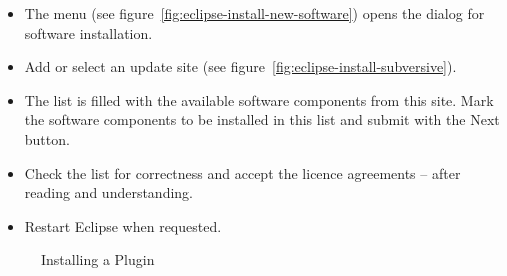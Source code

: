 \begin{itemize}
\item The menu  (see
  figure~\ref{fig:eclipse-install-new-software}) opens the dialog for
  software installation.
\item Add or select an update site (see
  figure~\ref{fig:eclipse-install-subversive}).
\item The list is filled with the available software components from
  this site.  Mark the software components to be installed in this
  list and submit with the \textsf{Next} button.
\item Check the list for correctness and accept the licence agreements
  -- after reading and understanding.
\item Restart Eclipse when requested.
\end{itemize}
\begin{figure}[ht]
  \hbox{}\hfill
  \hfill
  \hfill\hbox{}

  \caption{Installing a Plugin}\label{fig:eclipse-plugin}
\end{figure}


